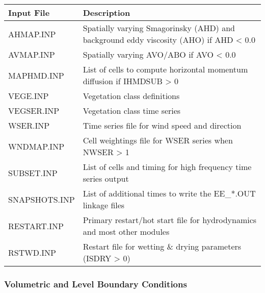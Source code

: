 \documentclass[letterpaper,10pt,english]{sphinxmanual}
\begin{document}
\begin{savenotes}\sphinxattablestart
\centering
\begin{tabulary}{\linewidth}[t]{|T|T|}
\hline
\sphinxstyletheadfamily 
Input File
&\sphinxstyletheadfamily 
Description
\\
\hline
AHMAP.INP
&
Spatially varying Smagorinsky (AHD) and background eddy viscosity (AHO) if AHD \textless{} 0.0
\\
\hline
AVMAP.INP
&
Spatially varying AVO/ABO if AVO \textless{} 0.0
\\
\hline
MAPHMD.INP
&
List of cells to compute horizontal momentum diffusion if IHMDSUB \textgreater{} 0
\\
\hline
VEGE.INP
&
Vegetation class definitions
\\
\hline
VEGSER.INP
&
Vegetation class time series
\\
\hline
WSER.INP
&
Time series file for wind speed and direction
\\
\hline
WNDMAP.INP
&
Cell weightings file for WSER series when NWSER \textgreater{} 1
\\
\hline
SUBSET.INP
&
List of cells and timing for high frequency time series output
\\
\hline
SNAPSHOTS.INP
&
List of additional times to write the EE\_*.OUT linkage files
\\
\hline
RESTART.INP
&
Primary restart/hot start file for hydrodynamics and most other modules
\\
\hline
RSTWD.INP
&
Restart file for wetting \& drying parameters (ISDRY \textgreater{} 0)
\\
\hline
\end{tabulary}
\par
\sphinxattableend\end{savenotes}


\subsubsection{Volumetric and Level Boundary Conditions}
\label{\detokenize{inputfiles/general_transport/index:volumetric-and-level-boundary-conditions}}
\end{document}
